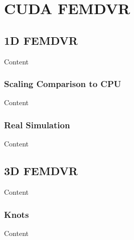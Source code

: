 
\chapter{CUDA FEMDVR} %

\label{ch:name} %


\section{1D FEMDVR}

Content


\subsection{Scaling Comparison to CPU}

Content


\subsection{Real Simulation}

Content


\section{3D FEMDVR}

Content


\subsection{Knots}

Content